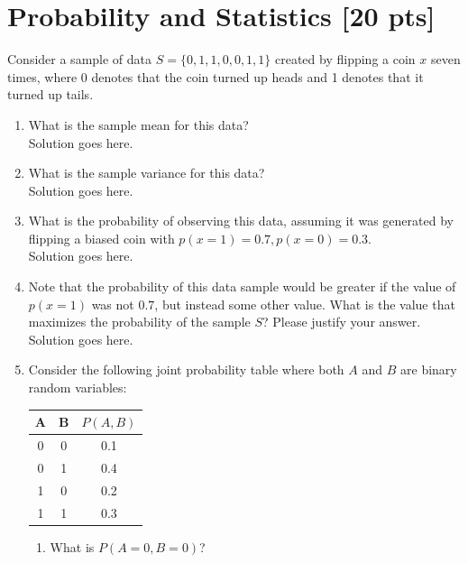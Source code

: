 \documentclass[a4paper]{article}
\theoremstyle{definition}
\newenvironment{soln}{
    \leavevmode\color{blue}\ignorespaces
}{}
\begin{document}
\section{Probability and Statistics [20 pts]}
Consider a sample of data $S = \{0, 1, 1, 0, 0, 1, 1\}$ created by flipping a coin $x$ seven times, where 0 denotes that the coin turned up heads and 1 denotes that it turned up tails.
\begin{enumerate}
	\item 	What is the sample mean for this data?\\
	    \begin{soln}  Solution goes here. \end{soln}
	\item 	What is the sample variance for this data?\\
	    \begin{soln}  Solution goes here. \end{soln}
	\item 	What is the probability of observing this data, assuming it was generated by flipping a biased coin with $p(x=1) = 0.7, p(x=0) = 0.3$.\\
	    \begin{soln}  Solution goes here. \end{soln}
	\item 	Note that the probability of this data sample would be greater if the value of $p(x = 1)$ was not $0.7$, but instead some other value. What is the value that maximizes the probability of the sample $S$? Please justify your answer.\\
	    \begin{soln}  Solution goes here. \end{soln}
	\item 	Consider the following joint probability table where both $A$ and $B$ are binary random variables: 
\begin{table}[htb]
\centering
	\begin{tabular}{ccc}\hline
	A & B & $P(A, B)$  \\\hline
	0 & 0 & 0.1 \\
	0 & 1 & 0.4 \\
	1 & 0 & 0.2 \\
	1 & 1 & 0.3 \\\hline
	\end{tabular}
\end{table}
\begin{enumerate}
	\item 	What is $P(A = 0, B = 0)$?\\

\end{enumerate}
\end{enumerate}
\end{document}
